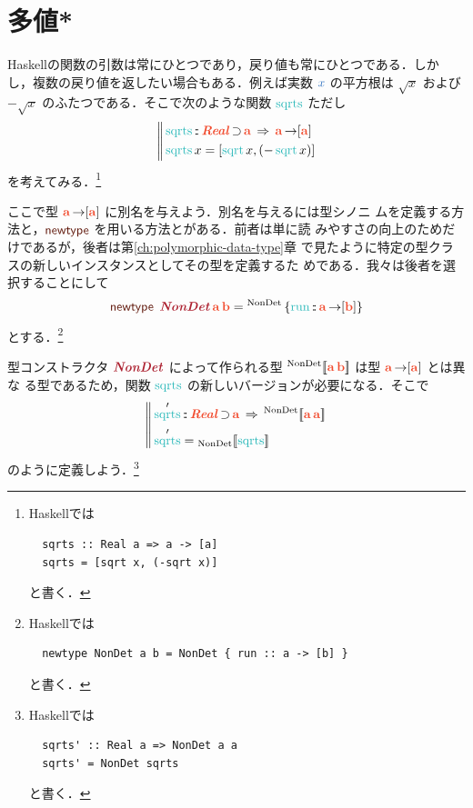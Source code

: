 \documentclass[a5paper,twoside,fleqn,draft]{jsbook}
\def\[{[\![}
\def\]{]\!]}
\def\keywordColor{Sepia}
\def\varColor{NavyBlue}
\def\funcColor{BlueGreen}
\def\typeColor{RedOrange}
\def\typeConstColor{Maroon}
\newcommand{\programminglanguage}[1]{\textsf{#1}}
\newcommand{\haskell}{\programminglanguage{Haskell}}
\newcommand{\mBrace}{\Vert}
\newcommand{\mKeyword}[1]{\textcolor{\keywordColor}{\mathsf{#1}}}
\newcommand{\mNewTypeDeclKeyword}{\mKeyword{newtype}}
\newcommand{\mTypeConstructor}[1]{\textcolor{\typeConstColor}{\textbf{\textit{#1}}}}
\DeclareMathOperator{\mNewTypeDecl}{\mNewTypeDeclKeyword}
\DeclareMathOperator{\mSuperClass}{\;\Rightarrow\;}
\DeclareMathOperator{\mSuperSet}{\supset}
\newcommand{\mVar}[1]{\textcolor{\varColor}{#1}}
\newcommand{\mXVar}{\mVar{x}}
\newcommand{\mSpecialFunc}[1]{\textcolor{\funcColor}{\textrm{#1}}}
\DeclareMathOperator{\mRun}{\mSpecialFunc{run}}
\DeclareMathOperator{\mSqrt}{\mSpecialFunc{sqrt}}
\DeclareMathOperator{\mSqrts}{\mSpecialFunc{sqrts}}
\DeclareMathOperator{\mFuncArrow}{\rightarrow}
\DeclareMathOperator{\mIn}{{:\!:}}
\newcommand{\mType}[1]{\textcolor{\typeColor}{\mathbf{#1}}}
\newcommand{\mA}{\mType{a}}
\newcommand{\mB}{\mType{b}}
\newcommand{\mTypeAssemble}[2]{{}^\mathrm{#1}\[\mType{#2}\]}
\newcommand{\mValueConstructor}[1]{\mathrm{#1}}
\newcommand{\mValueWith}[2]{{}_\mValueConstructor{#1}\[\mVar{#2}\]}
\newcommand{\mValueRecordBeginWith}[1]{{}^\mValueConstructor{#1}\,\{}
\newcommand{\mValueRecordEnd}{\}}
\newcommand{\mValueRecordWith}[2]{\mValueRecordBeginWith{#1}{#2}\mValueRecordEnd}
\newcommand{\mTypeClass}[1]{\textcolor{\typeColor}{\textbf{\textit{#1}}}}
\newcommand{\mRealTypeClass}{\mTypeClass{Real}}
\begin{document}
\section{多値*}

\haskell の関数の引数は常にひとつであり，戻り値も常にひとつである．しか
し，複数の戻り値を返したい場合もある．例えば実数 $\mXVar$ の平方根は
$\sqrt{x}$ および $-\sqrt{x}$ のふたつである．そこで次のような関数
$\mSqrts$ ただし
\begin{equation}
  \left\mBrace
  \begin{aligned}
    &\mSqrts\mIn{}\mRealTypeClass\mSuperSet\mA \mSuperClass
    \mA\mFuncArrow[\mA]\\
    &\mSqrts x=[\mSqrt x,(-\mSqrt x)]
  \end{aligned}
  \right.
\end{equation}
を考えてみる．\footnote{\haskell では
\begin{verbatim}
  sqrts :: Real a => a -> [a]
  sqrts = [sqrt x, (-sqrt x)]
\end{verbatim}
と書く．}

ここで型 $\mA\mFuncArrow[\mA]$ に別名を与えよう．別名を与えるには型シノニ
ムを定義する方法と，$\mNewTypeDecl$ を用いる方法とがある．前者は単に読
みやすさの向上のためだけであるが，後者は第\ref{ch:polymorphic-data-type}章
で見たように特定の型クラスの新しいインスタンスとしてその型を定義するた
めである．我々は後者を選択することにして
\begin{equation}
  \mNewTypeDecl\;
  \mTypeConstructor{NonDet}\,\mA\,\mB
  =\mValueRecordWith{NonDet}{\mRun\mIn\mA\mFuncArrow[\mB]}
\end{equation}
とする．\footnote{\haskell では
\begin{verbatim}
  newtype NonDet a b = NonDet { run :: a -> [b] }
\end{verbatim}
と書く．}

型コンストラクタ $\mTypeConstructor{NonDet}$ によって作られる型
$\mTypeAssemble{NonDet}{\mA\,\mB}$ は型 $\mA\mFuncArrow[\mA]$ とは異な
る型であるため，関数 $\mSqrts$ の新しいバージョンが必要になる．そこで
\begin{equation}
  \left\mBrace
  \begin{aligned}
    &\mSqrts'
    \mIn\mRealTypeClass\mSuperSet\mA
    \mSuperClass\mTypeAssemble{NonDet}{\mA\,\mA}\\
    &\mSqrts'
    =\mValueWith{NonDet}{\mSqrts}
  \end{aligned}
  \right.
\end{equation}
のように定義しよう．\footnote{\haskell では
\begin{verbatim}
  sqrts' :: Real a => NonDet a a
  sqrts' = NonDet sqrts
\end{verbatim}
と書く．}
\end{document}
